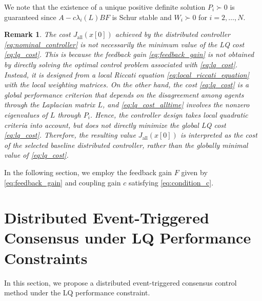 \documentclass[letterpaper,10pt,conference]{ieeeconf}
\newtheorem{remark}{Remark}
\begin{document}
We note that the existence of a unique positive definite solution $P_i \succ 0$ is guaranteed since $A - c\lambda_i(L)BF$ is Schur stable and $W_i \succ 0$ for $i=2,\dots,N$.

\begin{remark} \label{rem:local_cost}
  The cost $J_{\mathrm{all}}(x[0])$ achieved by the distributed controller \eqref{eq:nominal_controller} is not necessarily the minimum value of the LQ cost \eqref{eq:lq_cost}.
  This is because the feedback gain \eqref{eq:feedback_gain} is not obtained by directly solving the optimal control problem associated with \eqref{eq:lq_cost}.
  Instead, it is designed from a local Riccati equation \eqref{eq:local_riccati_equation} with the local weighting matrices.
  On the other hand, the cost \eqref{eq:lq_cost} is a global performance criterion that depends on the disagreement among agents through the Laplacian matrix $L$, and \eqref{eq:lq_cost_alltime} involves the nonzero eigenvalues of $L$ through $P_i$.
  Hence, the controller design takes local quadratic criteria into account, but does not directly minimize the global LQ cost \eqref{eq:lq_cost}.
  Therefore, the resulting value $J_{\mathrm{all}}(x[0])$ is interpreted as the cost of the selected baseline distributed controller, rather than the globally minimal value of \eqref{eq:lq_cost}.
\end{remark}

In the following section, we employ the feedback gain $F$ given by \eqref{eq:feedback_gain} and coupling gain $c$ satisfying \eqref{eq:condition_c}.

\section{Distributed Event-Triggered Consensus under LQ Performance Constraints}
\label{sec:main_results}



In this section, we propose a distributed event-triggered consensus control method under the LQ performance constraint.
\end{document}
